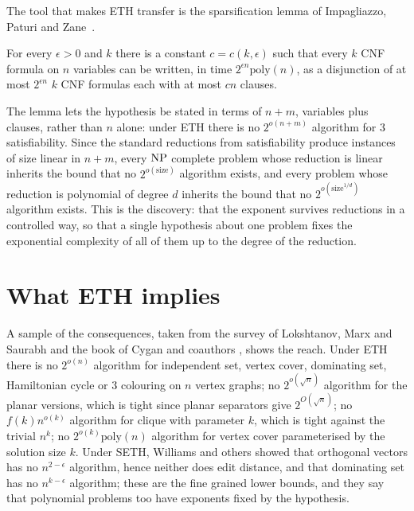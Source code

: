 The tool that makes ETH transfer is the sparsification lemma of Impagliazzo, Paturi and Zane~\cite{IPZ2001}.

\begin{theorem}[Sparsification]
For every $\epsilon > 0$ and $k$ there is a constant $c = c(k, \epsilon)$ such that every $k$ CNF formula on $n$ variables can be written, in time $2^{\epsilon n} \mathrm{poly}(n)$, as a disjunction of at most $2^{\epsilon n}$ $k$ CNF formulas each with at most $c n$ clauses.
\end{theorem}

The lemma lets the hypothesis be stated in terms of $n + m$, variables plus clauses, rather than $n$ alone: under ETH there is no $2^{o(n + m)}$ algorithm for $3$ satisfiability. Since the standard reductions from satisfiability produce instances of size linear in $n + m$, every $\mathrm{NP}$ complete problem whose reduction is linear inherits the bound that no $2^{o(\text{size})}$ algorithm exists, and every problem whose reduction is polynomial of degree $d$ inherits the bound that no $2^{o(\text{size}^{1/d})}$ algorithm exists. This is the discovery: that the exponent survives reductions in a controlled way, so that a single hypothesis about one problem fixes the exponential complexity of all of them up to the degree of the reduction.

\section{What ETH implies}

A sample of the consequences, taken from the survey of Lokshtanov, Marx and Saurabh \cite{LMS} and the book of Cygan and coauthors \cite{Cygan}, shows the reach. Under ETH there is no $2^{o(n)}$ algorithm for independent set, vertex cover, dominating set, Hamiltonian cycle or $3$ colouring on $n$ vertex graphs; no $2^{o(\sqrt n)}$ algorithm for the planar versions, which is tight since planar separators give $2^{O(\sqrt n)}$; no $f(k) n^{o(k)}$ algorithm for clique with parameter $k$, which is tight against the trivial $n^k$; no $2^{o(k)} \mathrm{poly}(n)$ algorithm for vertex cover parameterised by the solution size $k$. Under SETH, Williams \cite{Williams2005} and others showed that orthogonal vectors has no $n^{2 - \epsilon}$ algorithm, hence neither does edit distance, and that dominating set has no $n^{k - \epsilon}$ algorithm; these are the fine grained lower bounds, and they say that polynomial problems too have exponents fixed by the hypothesis.

